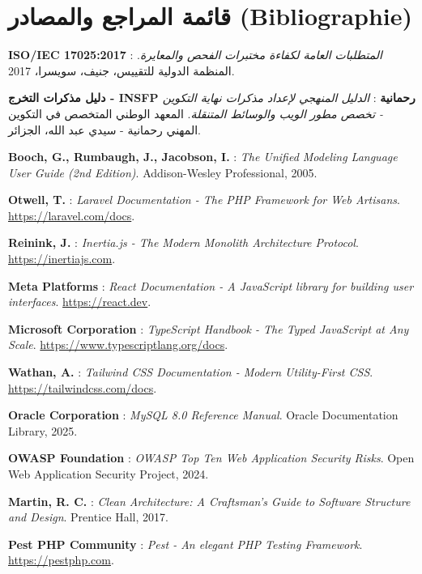 \documentclass{bts-report-ar}
\begin{document}
\chapter*{قائمة المراجع والمصادر (Bibliographie)}

\begin{enumerate}[label={[\arabic*]}]
  \item \textbf{ISO/IEC 17025:2017} : \textit{المتطلبات العامة لكفاءة مختبرات الفحص والمعايرة}. المنظمة الدولية للتقييس، جنيف، سويسرا، 2017.
  \item \textbf{دليل مذكرات التخرج - INSFP رحمانية} : \textit{الدليل المنهجي لإعداد مذكرات نهاية التكوين - تخصص مطور الويب والوسائط المتنقلة}. المعهد الوطني المتخصص في التكوين المهني رحمانية - سيدي عبد الله، الجزائر.
  \item \textbf{Booch, G., Rumbaugh, J., Jacobson, I.} : \textit{The Unified Modeling Language User Guide (2nd Edition)}. Addison-Wesley Professional, 2005.
  \item \textbf{Otwell, T.} : \textit{Laravel Documentation - The PHP Framework for Web Artisans}. \url{https://laravel.com/docs}.
  \item \textbf{Reinink, J.} : \textit{Inertia.js - The Modern Monolith Architecture Protocol}. \url{https://inertiajs.com}.
  \item \textbf{Meta Platforms} : \textit{React Documentation - A JavaScript library for building user interfaces}. \url{https://react.dev}.
  \item \textbf{Microsoft Corporation} : \textit{TypeScript Handbook - The Typed JavaScript at Any Scale}. \url{https://www.typescriptlang.org/docs}.
  \item \textbf{Wathan, A.} : \textit{Tailwind CSS Documentation - Modern Utility-First CSS}. \url{https://tailwindcss.com/docs}.
  \item \textbf{Oracle Corporation} : \textit{MySQL 8.0 Reference Manual}. Oracle Documentation Library, 2025.
  \item \textbf{OWASP Foundation} : \textit{OWASP Top Ten Web Application Security Risks}. Open Web Application Security Project, 2024.
  \item \textbf{Martin, R. C.} : \textit{Clean Architecture: A Craftsman's Guide to Software Structure and Design}. Prentice Hall, 2017.
  \item \textbf{Pest PHP Community} : \textit{Pest - An elegant PHP Testing Framework}. \url{https://pestphp.com}.
\end{enumerate}
\end{document}
